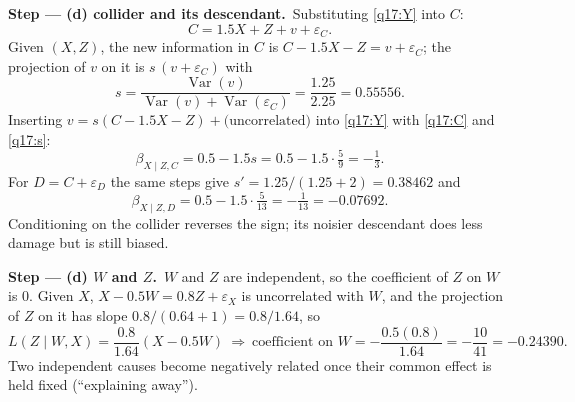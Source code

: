\documentclass[11pt,a4paper]{article}
\newcommand{\passo}[2]{\par\smallskip\noindent\textbf{Step --- #1.}~#2}
\begin{document}
\begin{sol}
\passo{(d) collider and its descendant}{Substituting \eqref{q17:Y} into $C$:
\begin{equation}
C=1.5X+Z+v+\varepsilon_C.\label{q17:C}
\end{equation}
Given $(X,Z)$, the new information in $C$ is $C-1.5X-Z=v+\varepsilon_C$; the projection of $v$ on it is
$s\,(v+\varepsilon_C)$ with
\begin{equation}
s=\frac{\operatorname{Var}(v)}{\operatorname{Var}(v)+\operatorname{Var}(\varepsilon_C)}=\frac{1.25}{2.25}=0.55556.\label{q17:s}
\end{equation}
Inserting $v=s(C-1.5X-Z)+\text{(uncorrelated)}$ into \eqref{q17:Y} with \eqref{q17:C} and \eqref{q17:s}:
\begin{equation}
\beta_{X\mid Z,C}=0.5-1.5s=0.5-1.5\cdot\tfrac{5}{9}=-\tfrac13.\label{q17:betaC}
\end{equation}
For $D=C+\varepsilon_D$ the same steps give $s'=1.25/(1.25+2)=0.38462$ and
\begin{equation}
\beta_{X\mid Z,D}=0.5-1.5\cdot\tfrac{5}{13}=-\tfrac{1}{13}=-0.07692.\label{q17:betaD}
\end{equation}
Conditioning on the collider reverses the sign; its noisier descendant does less damage but is still biased.}

\passo{(d) $W$ and $Z$}{$W$ and $Z$ are independent, so the coefficient of $Z$ on $W$ is $0$. Given $X$,
$X-0.5W=0.8Z+\varepsilon_X$ is uncorrelated with $W$, and the projection of $Z$ on it has slope
$0.8/(0.64+1)=0.8/1.64$, so
\begin{equation}
L(Z\mid W,X)=\frac{0.8}{1.64}(X-0.5W)\ \Rightarrow\ \text{coefficient on }W=-\frac{0.5(0.8)}{1.64}=-\frac{10}{41}=-0.24390.\label{q17:WZ}
\end{equation}
Two independent causes become negatively related once their common effect is held fixed (``explaining away'').}


\end{sol}
\end{document}
